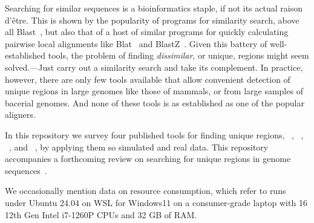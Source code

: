 Searching for similar sequences is a bioinformatics staple, if not its
actual raison d'\^etre. This is shown by the popularity of programs
for similarity search, above all Blast~\cite{alt90:bas,alt97:gap}, but
also that of a host of similar programs for quickly calculating
pairwise local alignments like Blat~\cite{ken02:bla} and
BlastZ~\cite{sch03:hum}. Given this battery of well-established tools,
the problem of finding \emph{dissimilar}, or unique, regions might
seem solved.---Just carry out a similarity search and take its
complement. In practice, however, there are only few tools available
that allow convenient detection of unique regions in large genomes
like those of mammals, or from large samples of bacerial genomes. And
none of these tools is as established as one of the popular aligners.

In this repository we survey four published tools for finding unique
regions, ~\cite{poc20:gen}, ~\cite{pir19:hig},
~\cite{ber21:kec}, and ~\cite{hau21:fur,vie24:mar}, by
applying them so simulated and real data. This repository accompanies
a forthcoming review on searching for unique regions in genome
sequences~\cite{vie25:fas}.

We occasionally mention data on resource consumption, which refer to
runs under Ubuntu 24.04 on WSL for Windows11 on a consumer-grade
laptop with 16 12th Gen Intel i7-1260P CPUs and 32 GB of RAM.

